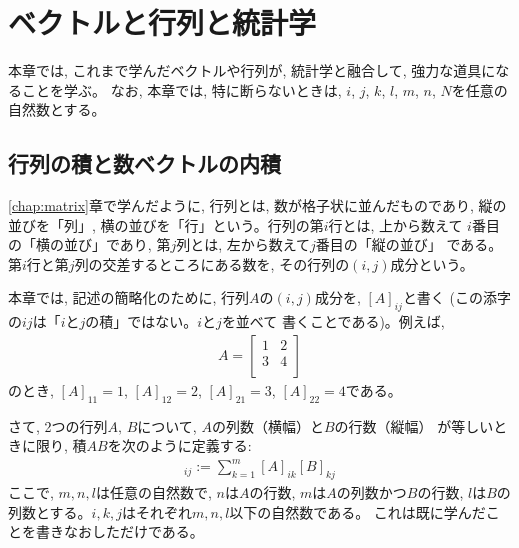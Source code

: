\chapter{ベクトルと行列と統計学}

本章では, これまで学んだベクトルや行列が, 統計学と融合して, 強力な道具になることを学ぶ。
なお, 本章では, 特に断らないときは, $i$, $j$, $k$, $l$, $m$, $n$, $N$を任意の自然数とする。

\section{行列の積と数ベクトルの内積}\label{sect:matrix_product_again}

\ref{chap:matrix}章で学んだように, 行列とは, 数が格子状に並んだものであり, 
縦の並びを「列」, 横の並びを「行」という。行列の第$i$行とは, 上から数えて
$i$番目の「横の並び」であり, 第$j$列とは, 左から数えて$j$番目の「縦の並び」
である。第$i$行と第$j$列の交差するところにある数を, その行列の$(i, j)$成分という。

本章では, 記述の簡略化のために, 行列$A$の$(i, j)$成分を, $[A]_{ij}$と書く
(この添字の$ij$は「$i$と$j$の積」ではない。$i$と$j$を並べて
書くことである)。例えば, 
\begin{eqnarray}
A=\begin{bmatrix}
1 & 2\\
3 & 4\\
\end{bmatrix}
\end{eqnarray}
のとき, $[A]_{11}=1$, $[A]_{12}=2$, $[A]_{21}=3$, $[A]_{22}=4$である。

さて, 2つの行列$A,\,B$について, $A$の列数（横幅）と$B$の行数（縦幅）
が等しいときに限り, 積$AB$を次のように定義する: 
\begin{eqnarray}
[AB]_{ij}:=\sum_{k=1}^{m}[A]_{ik}[B]_{kj}\label{eq:defmatrixproduct}
\end{eqnarray}
ここで, $m, n, l$は任意の自然数で, $n$は$A$の行数, $m$は$A$の列数かつ$B$の行数, 
$l$は$B$の列数とする。$i, k, j$はそれぞれ$m, n, l$以下の自然数である。
これは既に学んだことを書きなおしただけである。


